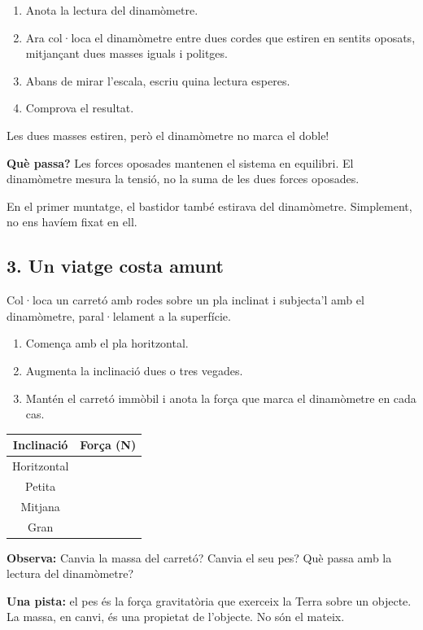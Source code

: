 \begin{enumerate}
    \item Anota la lectura del dinamòmetre.
    \item Ara col·loca el dinamòmetre entre dues cordes que estiren en sentits oposats, mitjançant dues masses iguals i politges.
    \item Abans de mirar l'escala, escriu quina lectura esperes.
    \item Comprova el resultat.
\end{enumerate}

Les dues masses estiren, però el dinamòmetre no marca el doble!

\textbf{Què passa?} Les forces oposades mantenen el sistema en equilibri. El dinamòmetre mesura la tensió, no la suma de les dues forces oposades.

En el primer muntatge, el bastidor també estirava del dinamòmetre. Simplement, no ens havíem fixat en ell.

\subsection{3. Un viatge costa amunt}

Col·loca un carretó amb rodes sobre un pla inclinat i subjecta'l amb el dinamòmetre, paral·lelament a la superfície.
\begin{enumerate}
    \item Comença amb el pla horitzontal.
    \item Augmenta la inclinació dues o tres vegades.
    \item Mantén el carretó immòbil i anota la força que marca el dinamòmetre en cada cas.
\end{enumerate}
\begin{center}
\begin{tabular}{|c|c|}
\hline
Inclinació & Força (N) \\ \hline
Horitzontal & \\[0.7em] \hline
Petita & \\[0.7em] \hline
Mitjana & \\[0.7em] \hline
Gran & \\[0.7em] \hline
\end{tabular}
\end{center}

\textbf{Observa:} Canvia la massa del carretó? Canvia el seu pes? Què passa amb la lectura del dinamòmetre?

\textbf{Una pista:} el pes és la força gravitatòria que exerceix la Terra sobre un objecte. La massa, en canvi, és una propietat de l'objecte. No són el mateix.

